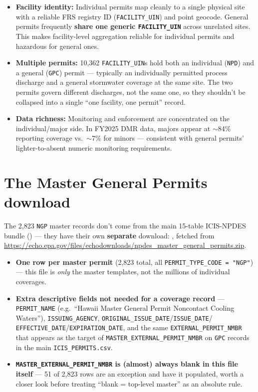 \documentclass[11pt]{article}
\begin{document}
\begin{itemize}
  \item \textbf{Facility identity:} Individual permits map cleanly to a single
        physical site with a reliable FRS registry ID (\texttt{FACILITY\_UIN})
        and point geocode. General permits frequently \textbf{share one generic
        \texttt{FACILITY\_UIN}} across unrelated sites. This makes
        facility-level aggregation reliable for individual permits and
        hazardous for general ones.
  \item \textbf{Multiple permits:} 10,362 \texttt{FACILITY\_UIN}s hold both an
        individual (\texttt{NPD}) and a general (\texttt{GPC}) permit ---
        typically an individually permitted process discharge and a general
        stormwater coverage at the same site. The two permits govern different
        discharges, not the same one, so they shouldn't be collapsed into a
        single ``one facility, one permit'' record.
  \item \textbf{Data richness:} Monitoring and enforcement are concentrated on
        the individual/major side. In FY2025 DMR data, majors appear at
        $\sim$84\% reporting coverage vs.\ $\sim$7\% for minors --- consistent
        with general permits' lighter-to-absent numeric monitoring
        requirements.
\end{itemize}

\section{The Master General Permits download}

The 2,823 \texttt{NGP} master records don't come from the main 15-table
ICIS-NPDES bundle () --- they have their own
\textbf{separate} download: , fetched from
\url{https://echo.epa.gov/files/echodownloads/npdes_master_general_permits.zip}.

\begin{itemize}
  \item \textbf{One row per master permit} (2,823 total, all
        \texttt{PERMIT\_TYPE\_CODE = "NGP"}) --- this file is \textit{only} the
        master templates, not the millions of individual coverages.
  \item \textbf{Extra descriptive fields not needed for a coverage record} ---
        \texttt{PERMIT\_NAME} (e.g.\ ``Hawaii Master General Permit Noncontact
        Cooling Waters''), \texttt{ISSUING\_AGENCY},
        \texttt{ORIGINAL\_ISSUE\_DATE}/\texttt{ISSUE\_DATE}/%
        \texttt{EFFECTIVE\_DATE}/\texttt{EXPIRATION\_DATE}, and the same
        \texttt{EXTERNAL\_PERMIT\_NMBR} that appears as the target of
        \texttt{MASTER\_EXTERNAL\_PERMIT\_NMBR} on \texttt{GPC} records in the
        main \texttt{ICIS\_PERMITS.csv}.
  \item \textbf{\texttt{MASTER\_EXTERNAL\_PERMIT\_NMBR} is (almost) always blank
        in this file itself} --- 51 of 2,823 rows are an exception and have it
        populated, worth a closer look before treating ``blank = top-level
        master'' as an absolute rule.
\end{itemize}
\end{document}
